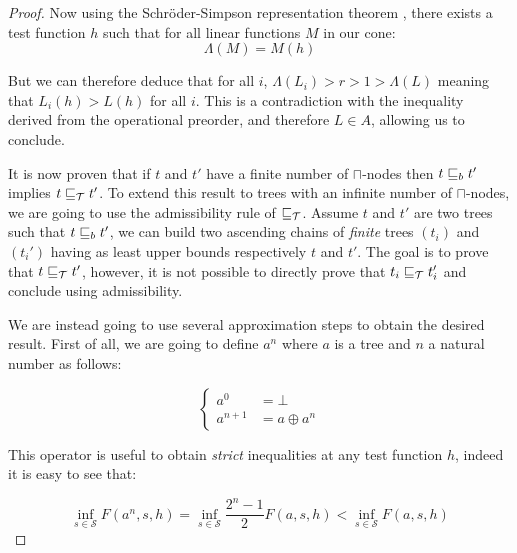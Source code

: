 \begin{proof}
    Now using the Schröder-Simpson representation theorem \cite{SchroderS06}, 
    there exists a test function $h$ such that for all linear functions $M$
    in our cone:
    \begin{equation*}
        \Lambda (M) = M(h)
    \end{equation*}

    But we can therefore deduce that for all $i$, $\Lambda (L_i) > r > 1 > \Lambda (L)$
    meaning that $L_i (h) > L(h)$ for all $i$. This is a contradiction with 
    the inequality derived from the operational preorder, and therefore $L \in
    A$, allowing us to conclude.

    \vspace{2em}

    It is now proven that if $t$ and $t'$ have a finite number of $\sqcap$-nodes 
    then $t \sqsubseteq_b t'$ implies $t \sqsubseteq_\mathcal{T} t'$. To extend this result 
    to trees with an infinite number of $\sqcap$-nodes, we are going to use 
    the admissibility rule of $\sqsubseteq_\mathcal{T}$. Assume $t$ and $t'$ are 
    two trees such that $t \sqsubseteq_b t'$, we can build two ascending chains 
    of \emph{finite} trees $(t_i)$ and $(t_i')$ having as least upper bounds 
    respectively $t$ and $t'$. The goal is to prove that $t \sqsubseteq_\mathcal{T}
    t'$, however, it is not possible to directly prove that $t_i
    \sqsubseteq_\mathcal{T} t_i'$ and conclude using admissibility.
    
    We are instead going to use several approximation steps to obtain
    the desired result. First of all, we are going to define 
    $a^n$ where $a$ is a tree and $n$ a natural number as follows:

    \begin{equation*}
        \begin{cases}
            a^0 &= \bot \\
            a^{n+1} &= a \oplus a^{n}
        \end{cases}
    \end{equation*}

    This operator is useful to obtain \emph{strict} inequalities at any test function $h$, 
    indeed it is easy to see that:

    \begin{equation*}
        \inf_{s \in \mathcal{S}} F(a^n,s,h) = 
        \inf_{s \in \mathcal{S}} \frac{2^n - 1}{2} F(a,s,h) 
        < 
        \inf_{s \in \mathcal{S}} F(a,s,h)
    \end{equation*}


\end{proof}
